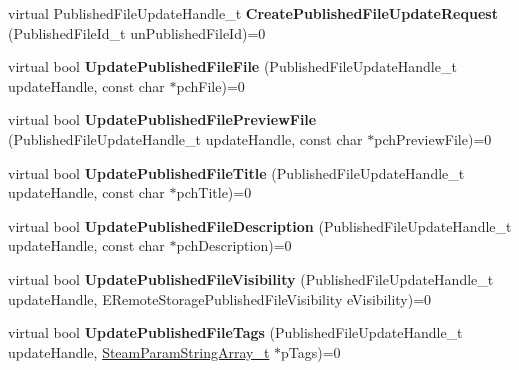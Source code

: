 \begin{DoxyCompactItemize}
\item 
\hypertarget{classISteamRemoteStorage_a526aef9c01f9dca8e3164cde25d9212f}{}virtual Published\+File\+Update\+Handle\+\_\+t {\bfseries Create\+Published\+File\+Update\+Request} (Published\+File\+Id\+\_\+t un\+Published\+File\+Id)=0\label{classISteamRemoteStorage_a526aef9c01f9dca8e3164cde25d9212f}

\item 
\hypertarget{classISteamRemoteStorage_a377263dd007c8075c16d03ddb2483b7e}{}virtual bool {\bfseries Update\+Published\+File\+File} (Published\+File\+Update\+Handle\+\_\+t update\+Handle, const char $\ast$pch\+File)=0\label{classISteamRemoteStorage_a377263dd007c8075c16d03ddb2483b7e}

\item 
\hypertarget{classISteamRemoteStorage_a40532394babd75cb94385d564b6b7c3c}{}virtual bool {\bfseries Update\+Published\+File\+Preview\+File} (Published\+File\+Update\+Handle\+\_\+t update\+Handle, const char $\ast$pch\+Preview\+File)=0\label{classISteamRemoteStorage_a40532394babd75cb94385d564b6b7c3c}

\item 
\hypertarget{classISteamRemoteStorage_a24e487bd11e7190a4ca9a7c062b4290d}{}virtual bool {\bfseries Update\+Published\+File\+Title} (Published\+File\+Update\+Handle\+\_\+t update\+Handle, const char $\ast$pch\+Title)=0\label{classISteamRemoteStorage_a24e487bd11e7190a4ca9a7c062b4290d}

\item 
\hypertarget{classISteamRemoteStorage_a65acbaf6d928f5b5216a4bede92eb50a}{}virtual bool {\bfseries Update\+Published\+File\+Description} (Published\+File\+Update\+Handle\+\_\+t update\+Handle, const char $\ast$pch\+Description)=0\label{classISteamRemoteStorage_a65acbaf6d928f5b5216a4bede92eb50a}

\item 
\hypertarget{classISteamRemoteStorage_ac2f1dfa1ca2fb2d3a29a848d484b0d36}{}virtual bool {\bfseries Update\+Published\+File\+Visibility} (Published\+File\+Update\+Handle\+\_\+t update\+Handle, E\+Remote\+Storage\+Published\+File\+Visibility e\+Visibility)=0\label{classISteamRemoteStorage_ac2f1dfa1ca2fb2d3a29a848d484b0d36}

\item 
\hypertarget{classISteamRemoteStorage_accef9ca4502e2102bd2656d05a4f03cf}{}virtual bool {\bfseries Update\+Published\+File\+Tags} (Published\+File\+Update\+Handle\+\_\+t update\+Handle, \hyperlink{structSteamParamStringArray__t}{Steam\+Param\+String\+Array\+\_\+t} $\ast$p\+Tags)=0\label{classISteamRemoteStorage_accef9ca4502e2102bd2656d05a4f03cf}


\end{DoxyCompactItemize}
